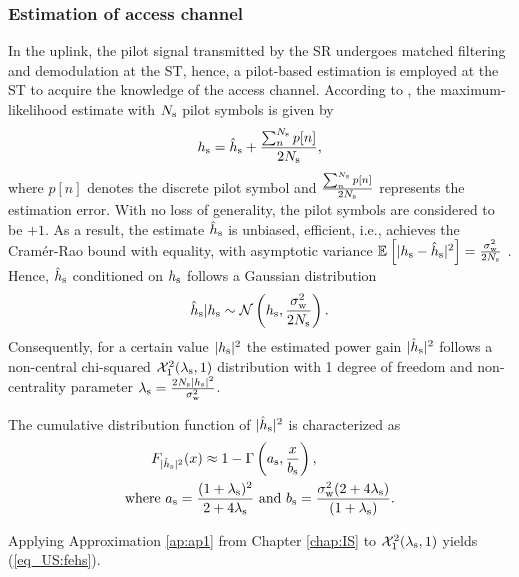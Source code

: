 \subsubsection{Estimation of access channel}
In the uplink, the pilot signal transmitted by the SR undergoes matched filtering and demodulation at the ST, hence, a pilot-based estimation is employed at the ST to acquire the knowledge of the access channel. According to \cite{Gifford08}, the maximum-likelihood estimate with $N_{\text{s}}$ pilot symbols is given by 
\begin{align}
h_{\text{s}} = \hat{h}_{\text{s}} + \frac{\sum^{N_{\text{s}}}_{n} p[n]}{2 N_{\text{s}}},
\label{eq_US:pilot_MLE}
\end{align}
where $p[n]$ denotes the discrete pilot symbol and $\frac{\sum^{N_{\text{s}}}_{n} p[n]}{2 N_{\text{s}}}$ represents the estimation error. With no loss of generality, the pilot symbols are considered to be $+1$.
As a result, the estimate $\hat{h}_{\text{s}}$ is unbiased, efficient, i.e., achieves the Cram\'er-Rao bound with equality, with asymptotic variance ${\mathbb E}_{}\left[ |h_{\text{s}} -\hat{h}_{\text{s}}|^2 \right] = \frac{\sigma^2_{\text{w}}}{2 N_{\text{s}}}$ \cite{Gifford08}. Hence, $\hat{h}_{\text{s}}$ conditioned on $h_{\text{s}}$ follows a Gaussian distribution
\begin{align}
\hat{h}_{\text{s}}|h_{\text{s}} \sim \mathcal{N}\left( h_{\text{s}},\frac{\sigma^2_{\text{w}}}{2 N_{\text{s}}} \right).
\label{eq_US:ehs} 
\end{align}
Consequently, for a certain value $|h_{\text{s}}|^2$ the estimated power gain $|\hat{h}_{\text{s}}|^2$ follows a non-central chi-squared $\ncchi2(\ls, 1)$ distribution with 1 degree of freedom and non-centrality parameter $\lambda_{\text{s}} = \frac{2 N_{\text{s}} |h_{\text{s}}|^2}{\sigma^2_{\text{w}}}$. 
\begin{lemma} \label{lm_US:lm2}
\normalfont
The cumulative distribution function of $|\hat{h}_{\text{s}}|^2$ is characterized as 
\begin{align}
F_{|\hat{h}_{\text{s}}|^2}(x) \approx 1 - \Gamma&\left(a_{\text{s}}, \frac{x}{b_{\text{s}}}\right) \label{eq_US:fehs},\\ 
\text{where  } a_{\text{s}} = \frac{(1 + \lambda_{\text{s}})^2}{2 + 4 \lambda_{\text{s}}} &\text{ and } b_{\text{s}} = \frac{\sigma^2_{\text{w}} (2 + 4 \lambda_{\text{s}})}{(1 + \lambda_{\text{s}})}. \label{eq_US:para_s} 
\end{align} 
\end{lemma}
\begin{IEEEproof}
Applying Approximation \ref{ap:ap1} from Chapter \ref{chap:IS} to $\ncchi2(\ls,1 )$ yields (\ref{eq_US:fehs}). 
\end{IEEEproof}

